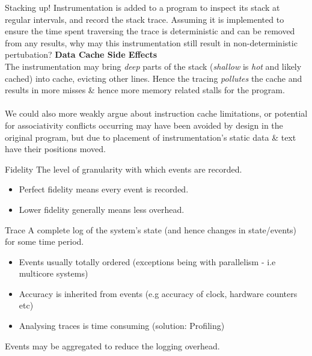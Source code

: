 \begin{examplebox}{Stacking up!}
    Instrumentation is added to a program to inspect its stack at regular intervals, and record 
    the stack trace. Assuming it is implemented to ensure the time spent traversing the trace is 
    deterministic and can be removed from any results, why may this instrumentation still result 
    in non-deterministic pertubation?
    \tcblower
    \textbf{Data Cache Side Effects}
    \\ The instrumentation may bring \textit{deep} parts of the stack  (\textit{shallow} is \textit{hot} and likely cached) into cache, evicting other lines.
    Hence the tracing \textit{pollutes} the cache and results in more misses \& hence more memory related stalls for the program.
    \\
    \\ We could also more weakly argue about instruction cache limitations, or potential for associativity conflicts occurring may have been avoided by design in the original program, but due to placement of instrumentation's static data \& text have their positions moved.
\end{examplebox}

\begin{definitionbox}{Fidelity}
    The level of granularity with which events are recorded.
    \begin{itemize}
        \item Perfect fidelity means every event is recorded.
        \item Lower fidelity generally means less overhead.
    \end{itemize}
\end{definitionbox}

\begin{definitionbox}{Trace}
    A complete log of the system's state (and hence changes in state/events) for some time period.
    \begin{itemize}
        \item Events usually totally ordered (exceptions being with parallelism - i.e multicore systems)
        \item Accuracy is inherited from events (e.g accuracy of clock, hardware counters etc)
        \item Analysing traces is time consuming (solution: Profiling)
    \end{itemize}
\end{definitionbox}

Events may be aggregated to reduce the logging overhead.

